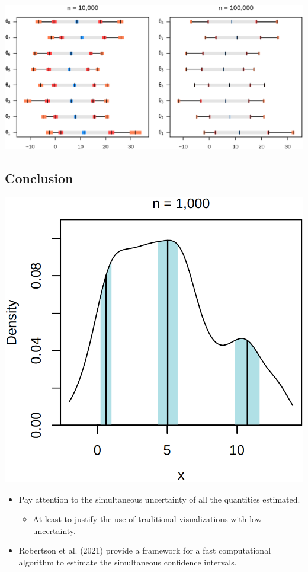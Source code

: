 \documentclass[
  letterpaper,
  DIV=11,
  numbers=noendperiod]{scrartcl}
\providecommand{\tightlist}{%
  \setlength{\itemsep}{0pt}\setlength{\parskip}{0pt}}\usepackage{longtable,booktabs,array}
\begin{document}
\includegraphics{intervals.png}

\hypertarget{conclusion}{%
\subsection{Conclusion}\label{conclusion}}

\includegraphics{mixture1.png}

\begin{itemize}
\tightlist
\item
  Pay attention to the simultaneous uncertainty of all the quantities
  estimated.

  \begin{itemize}
  \tightlist
  \item
    At least to justify the use of traditional visualizations with low
    uncertainty.
  \end{itemize}
\item
  Robertson et al. (2021) provide a framework for a fast computational
  algorithm to estimate the simultaneous confidence intervals.
\end{itemize}
\end{document}
